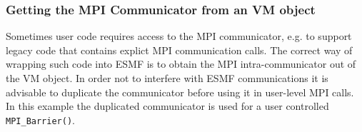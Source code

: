  
\setlength{\oldparskip}{\parskip}
\setlength{\parskip}{1.5ex}
\setlength{\oldparindent}{\parindent}
\setlength{\parindent}{0pt}
\setlength{\oldbaselineskip}{\baselineskip}
\setlength{\baselineskip}{11pt}
 
\def\bv{\begin{verbatim}}
\def\ev{\end{verbatim}}
\def\be{\begin{equation}}
\def\ee{\end{equation}}
\def\bea{\begin{eqnarray}}
\def\eea{\end{eqnarray}}
\def\bi{\begin{itemize}}
\def\ei{\end{itemize}}
\def\bn{\begin{enumerate}}
\def\en{\end{enumerate}}
\def\bd{\begin{description}}
\def\ed{\end{description}}
\def\({\left (}
\def\){\right )}
\def\[{\left [}
\def\]{\right ]}
\def\<{\left  \langle}
\def\>{\right \rangle}
\def\cI{{\cal I}}
\def\diag{\mathop{\rm diag}}
\def\tr{\mathop{\rm tr}}


 

  
   \subsubsection{Getting the MPI Communicator from an VM object}
  
   Sometimes user code requires access to the MPI communicator, e.g. to support
   legacy code that contains explict MPI communication calls. The correct way of
   wrapping such code into ESMF is to obtain the MPI intra-communicator out of
   the VM object. In order not to interfere with ESMF communications it is
   advisable to duplicate the communicator before using it in user-level MPI
   calls. In this example the duplicated communicator is used for a user
   controlled {\tt MPI\_Barrier()}.
   
